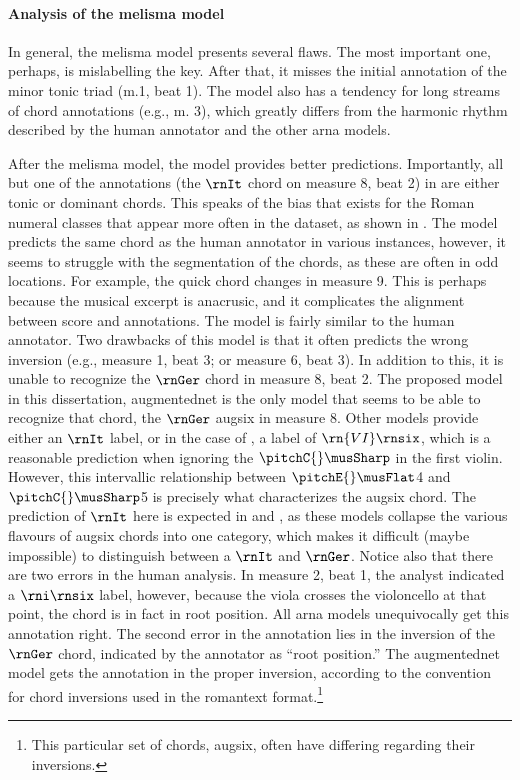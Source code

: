 \paragraph{Analysis of the \gls{melisma} model}

In general, the \gls{melisma} model presents several flaws.
The most important one, perhaps, is mislabelling the key.
After that, it misses the initial annotation of the minor
tonic triad (m.1, beat 1). The model also has a tendency for
long streams of chord annotations (e.g., m. 3), which
greatly differs from the harmonic rhythm described by the
human annotator and the other \gls{arna} models. 


After the \gls{melisma} model, the \textcite{chen2021attend}
model provides better predictions. Importantly, all but one
of the annotations (the $\rnIt$ chord on measure 8, beat 2)
in \textcite{chen2021attend} are either tonic or dominant
chords. This speaks of the bias that exists for the Roman
numeral classes that appear more often in the dataset, as
shown in . The \textcite{micchi2021deep}
model predicts the same chord as the human annotator in
various instances, however, it seems to struggle with the
segmentation of the chords, as these are often in odd
locations. For example, the quick chord changes in measure
9. This is perhaps because the musical excerpt is anacrusic,
and it complicates the alignment between score and
annotations. The \textcite{mcleod2021modular} model is
fairly similar to the human annotator. Two drawbacks of this
model is that it often predicts the wrong inversion (e.g.,
measure 1, beat 3; or measure 6, beat 3). In addition to
this, it is unable to recognize the $\rnGer$ chord in
measure 8, beat 2. The proposed model in this dissertation,
\gls{augmentednet} is the only model that seems to be able
to recognize that chord, the $\rnGer$ \gls{augsix} in
measure 8. Other models provide either an $\rnIt$ label, or
in the case of \textcite{mcleod2021modular}, a label of
$\rn{VI}\rnsix$, which is a reasonable prediction when
ignoring the $\pitchC{}\musSharp$ in the first violin.
However, this intervallic relationship between
$\pitchE{}\musFlat$4 and $\pitchC{}\musSharp$5 is precisely
what characterizes the \gls{augsix} chord. The prediction of
$\rnIt$ here is expected in \textcite{chen2021attend} and
\textcite{micchi2021deep}, as these models collapse the
various flavours of \gls{augsix} chords into one category,
which makes it difficult (maybe impossible) to distinguish
between a $\rnIt$ and $\rnGer$. Notice also that there are
two errors in the human analysis. In measure 2, beat 1, the
analyst indicated a $\rni\rnsix$ label, however, because the
viola crosses the violoncello at that point, the chord is in
fact in root position. All \gls{arna} models unequivocally
get this annotation right. The second error in the
annotation lies in the inversion of the $\rnGer$ chord,
indicated by the annotator as ``root position.'' The
\gls{augmentednet} model gets the annotation in the proper
inversion, according to the convention for chord inversions
used in the \gls{romantext} format.\footnote{This particular
set of chords, \gls{augsix}, often have differing regarding
their inversions.}

